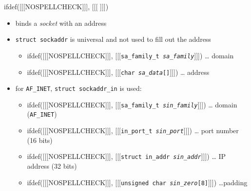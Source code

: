 \begin{slide}
ifdef([[[NOSPELLCHECK]]], [[[
]]])
\begin{itemize}
\item binds a \emph{socket} with an address
\item \texttt{struct sockaddr} is universal and not used to fill out the address
    \begin{itemize}
    \item ifdef([[[NOSPELLCHECK]]],
    [[[\texttt{sa\_family\_t \emph{sa\_family}}]]]) \dots{} domain
    \item ifdef([[[NOSPELLCHECK]]], [[[\texttt{char \emph{sa\_data}[]}]]])
     \dots{} address
    \end{itemize}
    \item for \texttt{AF\_INET}, \texttt{struct sockaddr\_in} is used:
    \begin{itemize}
    \item ifdef([[[NOSPELLCHECK]]],
    [[[\texttt{sa\_family\_t \emph{sin\_family}}]]]) \dots{} domain
    (\texttt{AF\_INET})
    \item ifdef([[[NOSPELLCHECK]]],
    [[[\texttt{in\_port\_t \emph{sin\_port}}]]]) \dots{} port number (16 bits)
    \item ifdef([[[NOSPELLCHECK]]],
    [[[\texttt{struct in\_addr \emph{sin\_addr}}]]]) \dots{}
    IP address (32 bits)
    \item ifdef([[[NOSPELLCHECK]]],
    [[[\texttt{unsigned char \emph{sin\_zero}[8]}]]]) \dots padding
    \end{itemize}
\end{itemize}
\end{slide}

